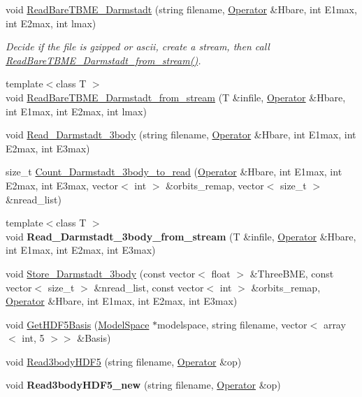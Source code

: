 \begin{DoxyCompactItemize}
\item 
void \hyperlink{classReadWrite_a7d1ea6782d893eab0217bb965fba990e}{Read\+Bare\+T\+B\+M\+E\+\_\+\+Darmstadt} (string filename, \hyperlink{classOperator}{Operator} \&Hbare, int E1max, int E2max, int lmax)\hypertarget{classReadWrite_a7d1ea6782d893eab0217bb965fba990e}{}\label{classReadWrite_a7d1ea6782d893eab0217bb965fba990e}

\begin{DoxyCompactList}\small\item\em Decide if the file is gzipped or ascii, create a stream, then call \hyperlink{classReadWrite_a44acf6835321a8bee6a795523728da2e}{Read\+Bare\+T\+B\+M\+E\+\_\+\+Darmstadt\+\_\+from\+\_\+stream()}. \end{DoxyCompactList}\item 
{\footnotesize template$<$class T $>$ }\\void \hyperlink{classReadWrite_a44acf6835321a8bee6a795523728da2e}{Read\+Bare\+T\+B\+M\+E\+\_\+\+Darmstadt\+\_\+from\+\_\+stream} (T \&infile, \hyperlink{classOperator}{Operator} \&Hbare, int E1max, int E2max, int lmax)
\item 
void \hyperlink{classReadWrite_a84c0cbaf2be415eadffb560ea0bb9785}{Read\+\_\+\+Darmstadt\+\_\+3body} (string filename, \hyperlink{classOperator}{Operator} \&Hbare, int E1max, int E2max, int E3max)
\item 
size\+\_\+t \hyperlink{classReadWrite_a61a1a2eeb9b94d6dbf754ca668639d5c}{Count\+\_\+\+Darmstadt\+\_\+3body\+\_\+to\+\_\+read} (\hyperlink{classOperator}{Operator} \&Hbare, int E1max, int E2max, int E3max, vector$<$ int $>$ \&orbits\+\_\+remap, vector$<$ size\+\_\+t $>$ \&nread\+\_\+list)
\item 
{\footnotesize template$<$class T $>$ }\\void {\bfseries Read\+\_\+\+Darmstadt\+\_\+3body\+\_\+from\+\_\+stream} (T \&infile, \hyperlink{classOperator}{Operator} \&Hbare, int E1max, int E2max, int E3max)\hypertarget{classReadWrite_af229332b05276f686966fdaaa98a81fd}{}\label{classReadWrite_af229332b05276f686966fdaaa98a81fd}

\item 
void \hyperlink{classReadWrite_a0796220c5ad1b8b07674d91174f2e237}{Store\+\_\+\+Darmstadt\+\_\+3body} (const vector$<$ float $>$ \&Three\+B\+ME, const vector$<$ size\+\_\+t $>$ \&nread\+\_\+list, const vector$<$ int $>$ \&orbits\+\_\+remap, \hyperlink{classOperator}{Operator} \&Hbare, int E1max, int E2max, int E3max)
\item 
void \hyperlink{classReadWrite_ad03f489c69c98d3ff1d33fbe9801c3d1}{Get\+H\+D\+F5\+Basis} (\hyperlink{classModelSpace}{Model\+Space} $\ast$modelspace, string filename, vector$<$ array$<$ int, 5 $>$$>$ \&Basis)
\item 
void \hyperlink{classReadWrite_a52656073ac0fa73c78dbd67c0f0e81e3}{Read3body\+H\+D\+F5} (string filename, \hyperlink{classOperator}{Operator} \&op)
\item 
void {\bfseries Read3body\+H\+D\+F5\+\_\+new} (string filename, \hyperlink{classOperator}{Operator} \&op)\hypertarget{classReadWrite_a524d4e87c842bbddc1c7ca9144a0e0da}{}\label{classReadWrite_a524d4e87c842bbddc1c7ca9144a0e0da}


\end{DoxyCompactItemize}
